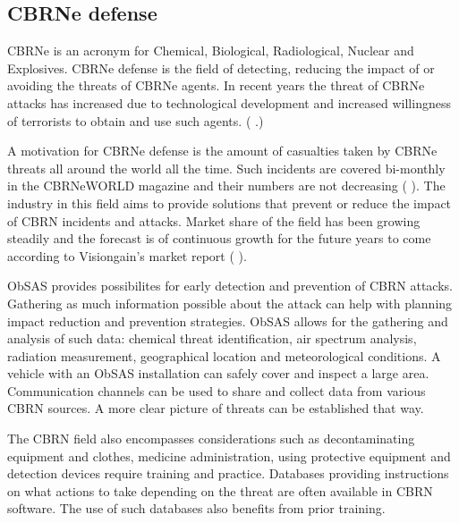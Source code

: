 \documentclass[12pt, a4paper,oneside, nocenter]{thesis}
\renewcommand{\citep}[1]{(\citeauthor{#1} \citeyear{#1}.)}
\renewcommand{\citeyearpar}[1]{(\citeauthor{#1} \citeyear{#1})}
\newcommand{\citeyeartitlexamkinline}[1]{(\usebibentry{#1}{title} \citeyear{#1})}
\begin{document}
\subsection{CBRNe defense}
CBRNe is an acronym for Chemical, Biological, Radiological, Nuclear and Explosives. CBRNe defense is the field of detecting, reducing the impact of or avoiding the threats of CBRNe agents. In recent years the threat of CBRNe attacks has increased due to technological development and increased willingness of terrorists to obtain and use such agents. \citep{crowd-behavior}
\par
A motivation for CBRNe defense is the amount of casualties taken by CBRNe threats all around the world all the time. Such incidents are covered bi-monthly in the CBRNeWORLD magazine and their numbers are not decreasing \citeyearpar{cbrne-world}. The industry in this field aims to provide solutions that prevent or reduce the impact of CBRN incidents and attacks. Market share of the field has been growing steadily and the forecast is of continuous growth for the future years to come according to Visiongain's market report \citeyeartitlexamkinline{cbrn-market-share}.
\par
ObSAS provides possibilites for early detection and prevention of CBRN attacks. Gathering as much information possible about the attack can help with planning impact reduction and prevention strategies. ObSAS allows for the gathering and analysis of such data: chemical threat identification, air spectrum analysis, radiation measurement, geographical location and meteorological conditions. A vehicle with an ObSAS installation can safely cover and inspect a large area. Communication channels can be used to share and collect data from various CBRN sources. A more clear picture of threats can be established that way.\par
The CBRN field also encompasses considerations such as decontaminating equipment and clothes, medicine administration, using protective equipment and detection devices require training and practice. Databases providing instructions on what actions to take depending on the threat are often available in CBRN software. The use of such databases also benefits from prior training.
\end{document}
